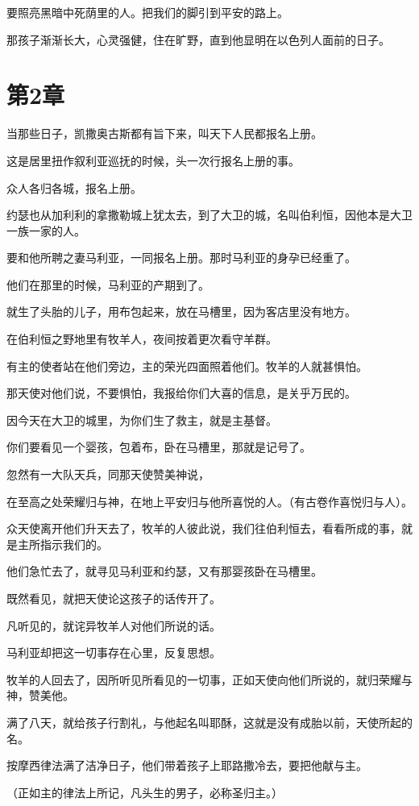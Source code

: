 \documentclass[12pt,oneside]{book}
\begin{document}
要照亮黑暗中死荫里的人。把我们的脚引到平安的路上。

那孩子渐渐长大，心灵强健，住在旷野，直到他显明在以色列人面前的日子。

\chapter{第2章}
当那些日子，凯撒奥古斯都有旨下来，叫天下人民都报名上册。

这是居里扭作叙利亚巡抚的时候，头一次行报名上册的事。

众人各归各城，报名上册。

约瑟也从加利利的拿撒勒城上犹太去，到了大卫的城，名叫伯利恒，因他本是大卫一族一家的人。

要和他所聘之妻马利亚，一同报名上册。那时马利亚的身孕已经重了。

他们在那里的时候，马利亚的产期到了。

就生了头胎的儿子，用布包起来，放在马槽里，因为客店里没有地方。

在伯利恒之野地里有牧羊人，夜间按着更次看守羊群。

有主的使者站在他们旁边，主的荣光四面照着他们。牧羊的人就甚惧怕。

那天使对他们说，不要惧怕，我报给你们大喜的信息，是关乎万民的。

因今天在大卫的城里，为你们生了救主，就是主基督。

你们要看见一个婴孩，包着布，卧在马槽里，那就是记号了。

忽然有一大队天兵，同那天使赞美神说，

在至高之处荣耀归与神，在地上平安归与他所喜悦的人。（有古卷作喜悦归与人）。

众天使离开他们升天去了，牧羊的人彼此说，我们往伯利恒去，看看所成的事，就是主所指示我们的。

他们急忙去了，就寻见马利亚和约瑟，又有那婴孩卧在马槽里。

既然看见，就把天使论这孩子的话传开了。

凡听见的，就诧异牧羊人对他们所说的话。

马利亚却把这一切事存在心里，反复思想。

牧羊的人回去了，因所听见所看见的一切事，正如天使向他们所说的，就归荣耀与神，赞美他。

满了八天，就给孩子行割礼，与他起名叫耶酥，这就是没有成胎以前，天使所起的名。

按摩西律法满了洁净日子，他们带着孩子上耶路撒冷去，要把他献与主。

（正如主的律法上所记，凡头生的男子，必称圣归主。）
\end{document}
